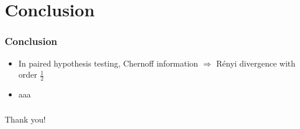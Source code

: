 \documentclass{beamer}
\begin{document}
\section{Conclusion}
\begin{frame}
\frametitle{Conclusion}
\begin{itemize}
\item In paired hypothesis testing, Chernoff information $\Rightarrow$ Rényi divergence with order $\frac{1}{2}$
\item aaa
\end{itemize}
\end{frame}

\begin{frame}
\frametitle{}
\begin{block}{}
\centering
{\Huge Thank you!}
\end{block}
\end{frame}
\end{document}
